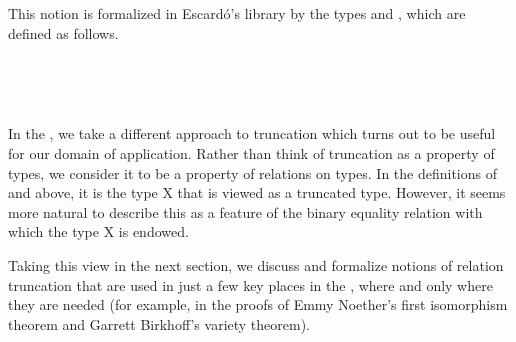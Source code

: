 \documentclass[a4paper,UKenglish,cleveref,autoref,thm-restate,11pt]{lipics-v2021}
\begin{document}

This notion is formalized in Escard\'o's \TypeTopology library by the types  and , which are defined as follows.
\ccpad
\begin{code}[number=code:is-set]
\>[0]\AgdaSpace{}%
\AgdaSymbol{:}\AgdaSpace{}%
%
\AgdaSpace{}%
\AgdaSpace{}%
%
\<%
\\
\>[0]\AgdaSpace{}%
\AgdaSpace{}%
\AgdaSymbol{=}\AgdaSpace{}%
\AgdaSymbol{(}\AgdaSpace{}%
\AgdaSpace{}%
\AgdaSymbol{:}\AgdaSpace{}%
\AgdaSymbol{)}\AgdaSpace{}%
\AgdaSpace{}%
\AgdaSpace{}%
\AgdaSymbol{(}\AgdaSpace{}%
\AgdaSpace{}%
\AgdaSymbol{)}\<%
\end{code}
\ccpad
\begin{code}[number=code:is-subsingleton]
\>[0]\AgdaSpace{}%
\AgdaSymbol{:}\AgdaSpace{}%
\AgdaSpace{}%
\AgdaSpace{}%
\AgdaSpace{}%
%
\<%
\\
\>[0]\AgdaSpace{}%
\AgdaSpace{}%
\AgdaSymbol{=}\AgdaSpace{}%
\AgdaSymbol{(}\AgdaSpace{}%
\AgdaSpace{}%
\AgdaSymbol{:}\AgdaSpace{}%
\AgdaSymbol{)}\AgdaSpace{}%
\AgdaSpace{}%
\AgdaSpace{}%
\AgdaSpace{}%
\<%
\end{code}
\ccpad

In the \agdaualib, we take a different approach to truncation which turns out to be useful for our domain of application.  Rather than think of truncation as a property of types, we consider it to be a property of relations on types.  In the definitions of  and  above, it is the type \ab X that is viewed as a truncated type.  However, it seems more natural to describe this as a feature of the binary equality relation  with which the type \ab X is endowed.

Taking this view in the next section, we discuss and formalize notions of relation truncation that are used in just a few key places in the \ualib, where and only where they are needed (for example, in the proofs of Emmy Noether's first isomorphism theorem and Garrett Birkhoff's variety theorem).
\end{document}
